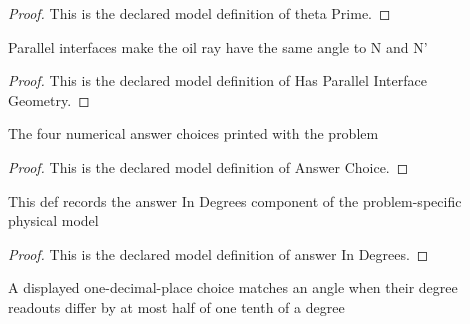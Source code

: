 \begin{proof}
  This is the declared model definition of theta Prime.
\end{proof}
\begin{definition}
  \label{def:physics:phyx-mini-0000:phyxminiproblems-problemphyxmini0000-hasparallelinterfacegeometry}
  Parallel interfaces make the oil ray have the same angle to N and N'
\end{definition}
\begin{proof}
  This is the declared model definition of Has Parallel Interface Geometry.
\end{proof}
\begin{definition}
  \label{def:physics:phyx-mini-0000:phyxminiproblems-problemphyxmini0000-answerchoice}
  The four numerical answer choices printed with the problem
\end{definition}
\begin{proof}
  This is the declared model definition of Answer Choice.
\end{proof}
\begin{definition}
  \label{def:physics:phyx-mini-0000:phyxminiproblems-problemphyxmini0000-answerindegrees}
  This def records the answer In Degrees component of the problem-specific physical model
\end{definition}
\begin{proof}
  This is the declared model definition of answer In Degrees.
\end{proof}
\begin{definition}
  \label{def:physics:phyx-mini-0000:phyxminiproblems-problemphyxmini0000-matchesanswertonearesttenth}
  A displayed one-decimal-place choice matches an angle when their degree readouts differ by at most half of one tenth of a degree
\end{definition}

